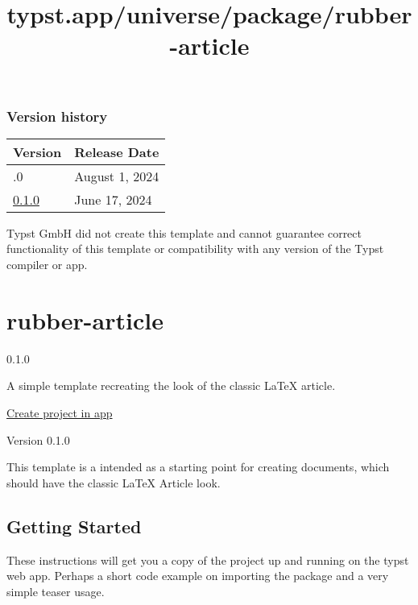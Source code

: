 \label{versions}
\subsubsection{Version history}\label{version-history}

\begin{longtable}[]{@{}ll@{}}
\toprule\noalign{}
Version & Release Date \\
\midrule\noalign{}
\endhead
\bottomrule\noalign{}
\endlastfoot
0.2.0 & August 1, 2024 \\
\href{https://typst.app/universe/package/canonical-nthu-thesis/0.1.0/}{0.1.0}
& June 17, 2024 \\
\end{longtable}

Typst GmbH did not create this template and cannot guarantee correct
functionality of this template or compatibility with any version of the
Typst compiler or app.


\title{typst.app/universe/package/rubber-article}

\label{banner}
\label{template-thumbnail}

\section{rubber-article}\label{rubber-article}

{ 0.1.0 }

A simple template recreating the look of the classic LaTeX article.

\href{/app?template=rubber-article&version=0.1.0}{Create project in app}

\label{readme}
Version 0.1.0

This template is a intended as a starting point for creating documents,
which should have the classic LaTeX Article look.

\subsection{Getting Started}\label{getting-started}

These instructions will get you a copy of the project up and running on
the typst web app. Perhaps a short code example on importing the package
and a very simple teaser usage.

\begin{Shaded}
\begin{Highlighting}[]


\NormalTok{  ),}
\NormalTok{)}
\end{Highlighting}
\end{Shaded}

